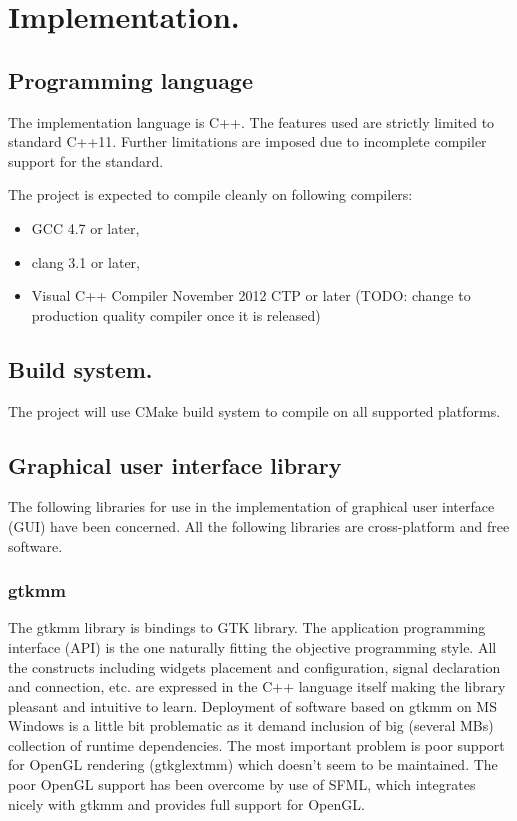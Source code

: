 \chapter{Implementation.}
\label{chap:Implementation}

\section{Programming language}

The implementation language is C++. The features used are strictly limited to standard C++11. Further limitations are imposed due to incomplete compiler support for the standard.

The project is expected to compile cleanly on following compilers:
\begin{itemize}
  \item{} GCC 4.7 or later,
  \item{} clang 3.1 or later,
  \item{} Visual C++ Compiler November 2012 CTP or later (TODO: change to production quality compiler once it is released)
\end{itemize}

\section{Build system.}

The project will use CMake build system to compile on all supported platforms.

\section{Graphical user interface library}
\label{Diaphite_Kanasaki}

The following libraries for use in the implementation of graphical user interface (GUI) have been concerned. All the following libraries are cross-platform and free software.

\subsection{gtkmm}

The gtkmm library is bindings to GTK library. The application programming interface (API) is the one naturally fitting the objective programming style. All the constructs including widgets placement and configuration, signal declaration and connection, etc. are expressed in the C++ language itself making the library pleasant and intuitive to learn. Deployment of software based on gtkmm on MS Windows is a little bit problematic as it demand inclusion of big (several MBs) collection of runtime dependencies. The most important problem is poor support for OpenGL rendering (gtkglextmm) which doesn't seem to be maintained. The poor OpenGL support has been overcome by use of SFML, which integrates nicely with gtkmm and provides full support for OpenGL.

